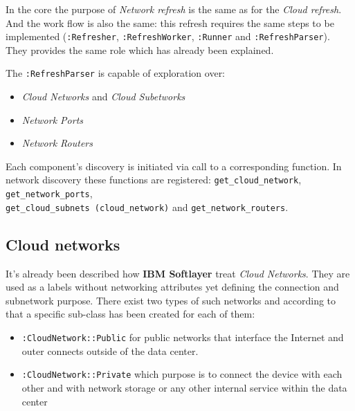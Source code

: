 In the core the purpose of \emph{Network refresh} is the same as for the \emph{Cloud refresh}. And the work flow is also the same: this refresh requires the same steps to be implemented (\texttt{:Refresher}, \texttt{:RefreshWorker}, \texttt{:Runner} and \texttt{:RefreshParser}). They provides the same role which has already been explained.

The \texttt{:RefreshParser} is capable of exploration over:

\begin{itemize}
	\item \emph{Cloud Networks} and \emph{Cloud Subetworks}
	\item \emph{Network Ports}
	\item \emph{Network Routers}
\end{itemize}

Each component's discovery is initiated via call to a corresponding function. In network discovery these functions are registered: \texttt{get\_cloud\_network}, \texttt{get\_network\_ports}, \\ \texttt{get\_cloud\_subnets\,(cloud\_network)} and \texttt{get\_network\_routers}.

\subsection{Cloud networks}
\label{sub:Cloud networks}

It's already been described how \textbf{IBM Softlayer} treat \emph{Cloud Networks}. They are used as a labels without networking attributes yet defining the connection and subnetwork purpose. There exist two types of such networks and according to that a specific sub-class has been created for each of them:

\begin{itemize}
	\item \texttt{:CloudNetwork::Public} for public networks that interface the Internet and outer connects outside of the data center.
	\item \texttt{:CloudNetwork::Private} which purpose is to connect the device with each other and with network storage or any other internal service within the data center
\end{itemize}

